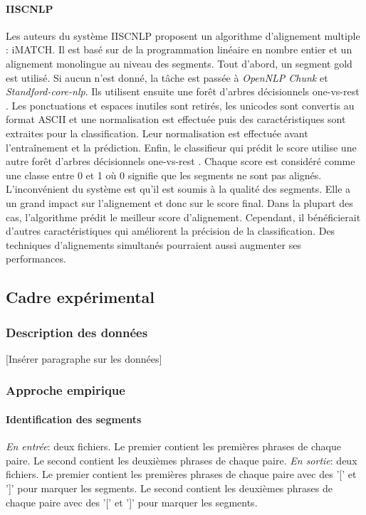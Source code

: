 \documentclass[a4paper, twoside, 11pt]{article}
\begin{document}
        \paragraph{IISCNLP}
        \hfill \break
 Les auteurs du système IISCNLP \cite{tekumalla} proposent un algorithme d’alignement multiple : iMATCH. Il est basé sur de la programmation linéaire en nombre entier et un alignement monolingue au niveau des segments. Tout d’abord, un segment \og gold \fg{} est utilisé. Si aucun n’est donné, la tâche est passée à \textit{OpenNLP Chunk} et \textit{Standford-core-nlp}. Ils utilisent ensuite une forêt d'arbres décisionnels \og one-vs-rest \fg{}. Les ponctuations et espaces inutiles sont retirés, les unicodes sont convertis au format ASCII et une normalisation est effectuée puis des caractéristiques sont extraites pour la classification. Leur normalisation est effectuée avant l’entraînement et la prédiction. Enfin, le classifieur qui prédit le score utilise une autre forêt d'arbres décisionnels \og one-vs-rest \fg{}. Chaque score est considéré comme une classe entre 0 et 1 où 0 signifie que les segments ne sont pas alignés. L’inconvénient du système est qu’il est soumis à la qualité des segments. Elle a un grand impact sur l’alignement et donc sur le score final. Dans la plupart des cas, l’algorithme prédit le meilleur score d’alignement. Cependant, il bénéficierait d’autres caractéristiques qui améliorent la précision de la classification. Des techniques d’alignements simultanés pourraient aussi augmenter ses performances.


    \subsection{Cadre expérimental}

        \subsubsection{Description des données}

 [Insérer paragraphe sur les données]

        \subsubsection{Approche empirique}

    \paragraph{Identification des segments}
    \hfill \break
    \textit{En entrée}: deux fichiers. Le premier contient les premières phrases de chaque paire. Le second contient les deuxièmes phrases de chaque paire. \hfill \break
    \textit{En sortie}: deux fichiers. Le premier contient les premières phrases de chaque paire avec des '[' et ']' pour marquer les segments. Le second contient les deuxièmes phrases de chaque paire avec des '[' et ']' pour marquer les segments.
\end{document}
